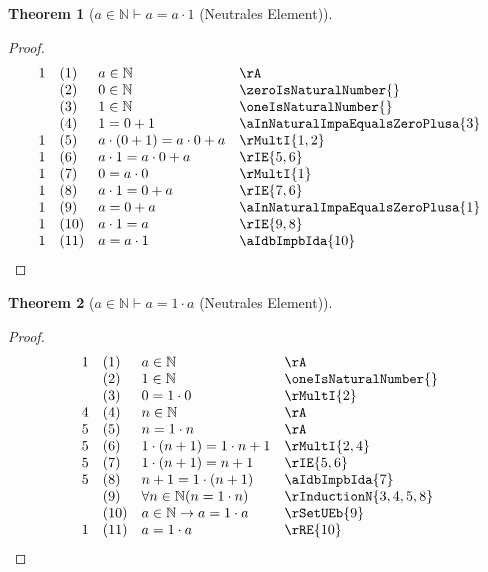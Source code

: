 \documentclass{book}
\theoremstyle{plain}
\newtheorem{theorem}{Theorem}
\theoremstyle{remark}
\theoremstyle{definition}
\begin{document}
\label{aInNaturalImpaEqualsaMultOne}
\begin{theorem}[\(a\in\mathbb{N}\vdash a=a\cdot 1\) (Neutrales Element)]
\end{theorem}
\begin{proof}
        \[
	\begin{array}{llll}
            1       &  (1) & a\in\mathbb{N} & \rA \\
                    &  (2) & 0\in\mathbb{N} & \zeroIsNaturalNumber{} \\
                    &  (3) & 1\in\mathbb{N} & \oneIsNaturalNumber{} \\
                    &  (4) & 1=0+1 & \aInNaturalImpaEqualsZeroPlusa{3} \\
            1       &  (5) & a\cdot (0+1) = a\cdot 0 + a & \rMultI{1,2} \\
            1       &  (6) & a\cdot 1 = a\cdot 0 + a & \rIE{5,6} \\
            1       &  (7) & 0=a\cdot 0 & \rMultI{1} \\
            1       &  (8) & a\cdot 1=0+a & \rIE{7,6} \\
            1       &  (9) & a=0+a & \aInNaturalImpaEqualsZeroPlusa{1} \\
            1       &  (10) & a\cdot 1=a & \rIE{9,8} \\
            1       &  (11) & a=a\cdot 1 & \aIdbImpbIda{10} \\
	\end{array}
	\]
\end{proof}

\label{aInNaturalImpaEqualsOneMulta}
\begin{theorem}[\(a\in\mathbb{N}\vdash a=1\cdot a\) (Neutrales Element)]
\end{theorem}
\begin{proof}
        \[
	\begin{array}{llll}
            1       &  (1) & a\in\mathbb{N} & \rA \\
                    &  (2) & 1\in\mathbb{N} & \oneIsNaturalNumber{} \\            
                    &  (3) & 0=1\cdot 0 & \rMultI{2} \\
            4       &  (4) & n\in\mathbb{N} & \rA \\
            5       &  (5) & n = 1\cdot n & \rA \\
            5       &  (6) & 1\cdot (n+1)=1\cdot n+1 & \rMultI{2,4} \\
            5       &  (7) & 1\cdot (n+1)=n+1 & \rIE{5,6} \\
            5       &  (8) & n+1=1\cdot (n+1) & \aIdbImpbIda{7} \\
                    &  (9) & \forall n\in\mathbb{N}(n=1\cdot n) & \rInductionN{3,4,5,8} \\
                    &  (10) & a\in\mathbb{N}\rightarrow a=1\cdot a & \rSetUEb{9} \\
            1       &  (11) & a=1\cdot a & \rRE{10} \\                    
	\end{array}
	\]
\end{proof}
\end{document}
